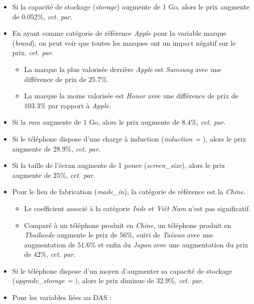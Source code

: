 \documentclass[
  12pt,
]{report}
\providecommand{\tightlist}{%
  \setlength{\itemsep}{0pt}\setlength{\parskip}{0pt}}\usepackage{longtable,booktabs,array}
\renewcommand{\texttt}[1]{\colorbox{light}{\color{highlight}{\ttfamily{#1}}}}
\begin{document}
\begin{itemize}
\item
  Si la capacité de stockage (\emph{storage}) augmente de 1 Go, alors le
  prix augmente de 0.052\%, \emph{cet. par.}
\item
  En ayant comme catégorie de référence \emph{Apple} pour la variable
  marque (\emph{brand}), on peut voir que toutes les marques ont un
  impact négatif sur le prix, \emph{cet. par.}

  \begin{itemize}
  \tightlist
  \item
    La marque la plus valorisée derrière \emph{Apple} est \emph{Samsung}
    avec une différence de prix de \(25.7\%\).
  \item
    La marque la moins valorisée est \emph{Honor} avec une différence de
    prix de \(103.3\%\) par rapport à \emph{Apple}.
  \end{itemize}
\item
  Si la \emph{ram} augmente de 1 Go, alors le prix augmente de
  \(8.4\%\), \emph{cet. par.}
\item
  Si le téléphone dispose d'une charge à induction (\emph{induction =
  \texttt{TRUE}}), alors le prix augmente de \(28.9\%\), \emph{cet.
  par.}
\item
  Si la taille de l'écran augmente de 1 pouce (\emph{screen\_size}),
  alors le prix augmente de \(25\%\), \emph{cet. par.}
\item
  Pour le lieu de fabrication (\emph{made\_in}), la catégorie de
  référence est la \emph{Chine}.

  \begin{itemize}
  \tightlist
  \item
    Le coefficient associé à la catégorie \emph{Inde} et \emph{Viêt Nam}
    n'est pas significatif.
  \item
    Comparé à un téléphone produit en \emph{Chine}, un téléphone produit
    en \emph{Thaïlande} augmente le prix de \(56\%\), suivi de
    \emph{Taïwan} avec une augmentation de \(51.6\%\) et enfin du
    \emph{Japon} avec une augmentation du prix de \(42\%\), \emph{cet.
    par.}
  \end{itemize}
\item
  Si le téléphone dispose d'un moyen d'augmenter sa capacité de stockage
  (\emph{upgrade\_storage = \texttt{TRUE}}), alors le prix diminue de
  \(32.9\%\), \emph{cet. par}.
\item
  Pour les variables liées au DAS :


\end{itemize}
\end{document}
